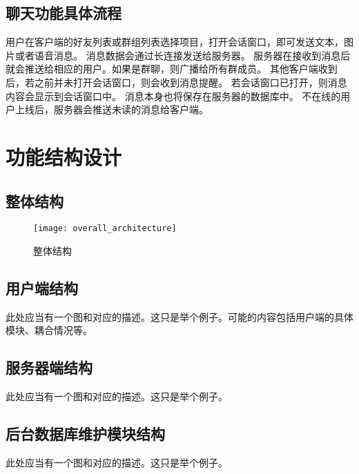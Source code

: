 \subsection{聊天功能具体流程}
用户在客户端的好友列表或群组列表选择项目，打开会话窗口，即可发送文本，图片或者语音消息。
消息数据会通过长连接发送给服务器。
服务器在接收到消息后就会推送给相应的用户。如果是群聊，则广播给所有群成员。
其他客户端收到后，若之前并未打开会话窗口，则会收到消息提醒。
若会话窗口已打开，则消息内容会显示到会话窗口中。
消息本身也将保存在服务器的数据库中。
不在线的用户上线后，服务器会推送未读的消息给客户端。

\section{功能结构设计}
\subsection{整体结构}

\begin{figure}[h]
	\centering
	\texttt{[image: overall\_architecture]}
	\caption{整体结构} \label{fig:overall_architecture}
\end{figure}

\subsection{用户端结构}
此处应当有一个图和对应的描述。这只是举个例子。可能的内容包括用户端的具体模块、耦合情况等。

\subsection{服务器端结构}
此处应当有一个图和对应的描述。这只是举个例子。

\subsection{后台数据库维护模块结构}
此处应当有一个图和对应的描述。这只是举个例子。



